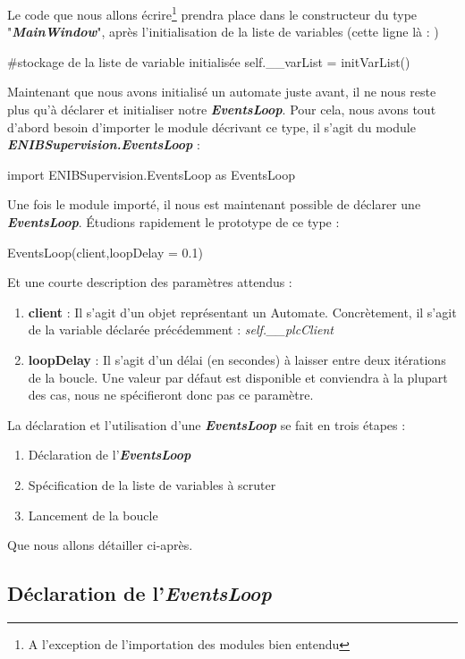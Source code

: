 \documentclass[12pt]{report}    %
\newcommand{\bold}[1]{{\bfseries #1}}
\newcommand{\italic}[1]{{\itshape #1}}
\newcommand{\ib}[1]{{\bfseries\itshape #1}}
\newcommand{\smallSkip}{\vskip 0.5cm}
\begin{document}
Le code que nous allons écrire\footnote{A l'exception de l'importation des modules bien entendu} prendra place dans le constructeur du type "\ib{MainWindow}", après l'initialisation de la liste de variables (cette ligne là : )
\begin{pyCode}
#stockage de la liste de variable initialisée
self.__varList = initVarList()
\end{pyCode}


Maintenant que nous avons initialisé un automate juste avant, il ne nous reste plus qu'à déclarer et initialiser notre \ib{EventsLoop}.\newline
Pour cela, nous avons tout d'abord besoin d'importer le module décrivant ce type, il s'agit du module \ib{ENIBSupervision.EventsLoop} :
\begin{pyCode}
import ENIBSupervision.EventsLoop as EventsLoop
\end{pyCode}
Une fois le module importé, il nous est maintenant possible de déclarer une \ib{EventsLoop}. Étudions rapidement le prototype de ce type :
\begin{pyCode}
EventsLoop(client,loopDelay = 0.1)
\end{pyCode}
Et une courte description des paramètres attendus :
\begin{enumerate}
    \item \bold{client} : Il s'agit d'un objet représentant un Automate. Concrètement, il s'agit de la variable déclarée précédemment : \italic{self.\_\_plcClient}

    \item \bold{loopDelay} : Il s'agit d'un délai (en secondes) à laisser entre deux itérations de la boucle. Une valeur par défaut est disponible et conviendra à la plupart des cas, nous ne spécifieront donc pas ce paramètre.
\end{enumerate}
\smallSkip

La déclaration et l'utilisation d'une \ib{EventsLoop} se fait en trois étapes :
\begin{enumerate}
    \item Déclaration de l'\ib{EventsLoop}
    \item Spécification de la liste de variables à scruter
    \item Lancement de la boucle
\end{enumerate}
Que nous allons détailler ci-après.

\subsection{Déclaration de l'\ib{EventsLoop}}
\end{document}
